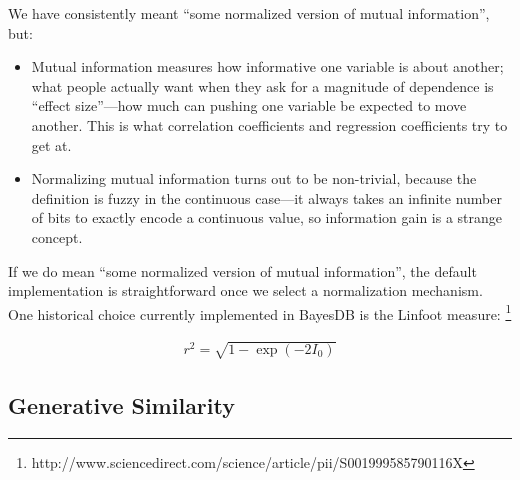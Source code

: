 \documentclass[10pt,letterpaper]{article}
\begin{document}

We have consistently meant ``some normalized version of mutual
information'', but:
\begin{itemize}
\item Mutual information measures how informative one variable is
  about another; what people actually want when they ask for a
  magnitude of dependence is ``effect size''---how much can pushing
  one variable be expected to move another.  This is what correlation
  coefficients and regression coefficients try to get at.
\item Normalizing mutual information turns out to be non-trivial,
  because the definition is fuzzy in the continuous case---it always
  takes an infinite number of bits to exactly encode a continuous
  value, so information gain is a strange concept.
\end{itemize}

If we do mean ``some normalized version of mutual information'', the
default implementation is straightforward once we select a
normalization mechanism.  One historical choice currently implemented in 
BayesDB is the Linfoot measure:
\footnote{http://www.sciencedirect.com/science/article/pii/S001999585790116X}

\begin{align*}
r^2 = \sqrt{1 - \exp{(-2I_0)}}
\end{align*}



\subsection{Generative Similarity}
\end{document}
